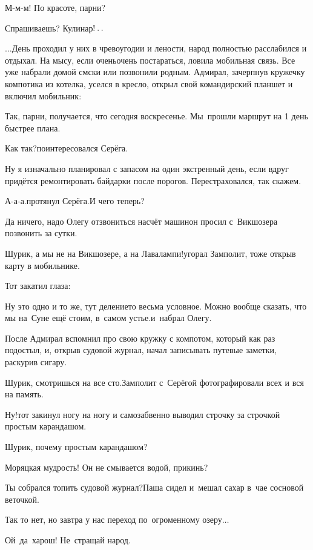 \diagdash М-м-м! По красоте, парни?

\diagdash Спрашиваешь? Кулинар$\exldots$%

$\ldots$День проходил у них в чревоугодии и лености, народ полностью расслабился и отдыхал. На мысу, если очень\sdash очень  постараться, ловила мобильная связь. Все уже набрали домой смс\sdash ки или позвонили родным. Адмирал, зачерпнув кружечку компотика из котелка, уселся в кресло, открыл свой командирский планшет и включил мобильник:

\diagdash Так, парни, получается, что сегодня воскресенье. Мы~прошли маршрут на 1 день быстрее плана.

\diagdash Как так?\mdash поинтересовался Серёга.

\diagdash Ну я изначально планировал с запасом на один экстренный день, если вдруг придётся ремонтировать байдарки после порогов. Перестраховался, так скажем.

\diagdash А-а-а.\mdash протянул Серёга.\mdash И чего теперь?

\diagdash Да ничего, надо Олегу отзвониться насчёт машин\mdash он просил с~Викшозера позвонить за сутки.

\diagdash Шурик, а мы не на Викшозере, а на Лавалампи!\mdash угорал Замполит, тоже открыв карту в мобильнике.

Тот закатил глаза:

\diagdash Ну это одно и то же, тут деление\sdash то весьма условное. Можно вообще сказать, что мы на~Суне ещё стоим, в~самом устье.\mdash и~набрал Олегу.

После Адмирал вспомнил про свою кружку с компотом, который как раз подостыл, и, открыв судовой журнал, начал записывать путевые заметки, раскурив сигару.

\diagdash Шурик, смотришься на все сто.\mdash Замполит с~Серёгой фотографировали всех и вся на память.

\diagdash Ну!\mdash тот закинул ногу на ногу и самозабвенно выводил строчку за строчкой простым карандашом.

\diagdash Шурик, почему простым карандашом?

\diagdash Моряцкая мудрость! Он не смывается водой, прикинь?

\diagdash Ты собрался топить судовой журнал?\mdash Паша сидел и~мешал сахар в~чае сосновой веточкой.

\diagdash Так то нет, но завтра у нас переход по~огроменному озеру$\ldots$

\diagdash Ой~да~харош! Не~стращай народ.

